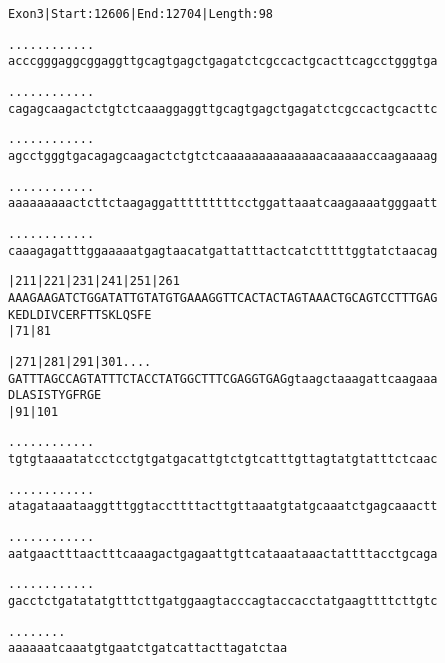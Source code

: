 \documentclass{article}
\begin{document}
\newpage
\begin{alltt}
Exon 3 | Start: 12606 | End: 12704 | Length: 98

.    .    .    .    .    .    .    .    .    .    .    .    
acccgggaggcggaggttgcagtgagctgagatctcgccactgcacttcagcctgggtga

.    .    .    .    .    .    .    .    .    .    .    .    
cagagcaagactctgtctcaaaggaggttgcagtgagctgagatctcgccactgcacttc

.    .    .    .    .    .    .    .    .    .    .    .    
agcctgggtgacagagcaagactctgtctcaaaaaaaaaaaaaacaaaaaccaagaaaag

.    .    .    .    .    .    .    .    .    .    .    .    
aaaaaaaaactcttctaagaggatttttttttcctggattaaatcaagaaaatgggaatt

.    .    .    .    .    .    .    .    .    .    .    .    
caaagagatttggaaaaatgagtaacatgattatttactcatctttttggtatctaacag

   |211      |221      |231      |241      |251      |261   
AAAGAAGATCTGGATATTGTATGTGAAAGGTTCACTACTAGTAAACTGCAGTCCTTTGAG
K  E  D  L  D  I  V  C  E  R  F  T  T  S  K  L  Q  S  F  E  
   |71                           |81                        

   |271      |281      |291      |301      .    .    .    . 
GATTTAGCCAGTATTTCTACCTATGGCTTTCGAGGTGAGgtaagctaaagattcaagaaa
D  L  A  S  I  S  T  Y  G  F  R  G  E                       
   |91                           |101                       

   .    .    .    .    .    .    .    .    .    .    .    . 
tgtgtaaaatatcctcctgtgatgacattgtctgtcatttgttagtatgtatttctcaac

   .    .    .    .    .    .    .    .    .    .    .    . 
atagataaataaggtttggtaccttttacttgttaaatgtatgcaaatctgagcaaactt

   .    .    .    .    .    .    .    .    .    .    .    . 
aatgaactttaactttcaaagactgagaattgttcataaataaactattttacctgcaga

   .    .    .    .    .    .    .    .    .    .    .    . 
gacctctgatatatgtttcttgatggaagtacccagtaccacctatgaagttttcttgtc

   .    .    .    .    .    .    .    .
aaaaaatcaaatgtgaatctgatcattacttagatctaa
\end{alltt}
\newpage
\end{document}

